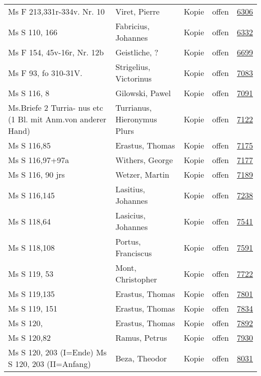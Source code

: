 \documentclass[10pt,a4paper,landscape]{report}
\begin{document}
\begin{longtable}{p{16cm}p{4cm}llr}
Ms F 213,331r-334v. Nr. 10	&	Viret, Pierre	&	Kopie	&	offen	&	\href{http://130.60.24.72/assignment/6306}{6306}\\
Ms S 110, 166	&	Fabricius, Johannes	&	Kopie	&	offen	&	\href{http://130.60.24.72/assignment/6332}{6332}\\
Ms F 154, 45v-16r, Nr. 12b	&	Geistliche, ?	&	Kopie	&	offen	&	\href{http://130.60.24.72/assignment/6699}{6699}\\
Ms F 93, fo 310-31V.	&	Strigelius, Victorinus	&	Kopie	&	offen	&	\href{http://130.60.24.72/assignment/7083}{7083}\\
Ms S 116, 8	&	Gilowski, Pawel	&	Kopie	&	offen	&	\href{http://130.60.24.72/assignment/7091}{7091}\\
Ms.Briefe 2 Turria- nus etc (1 Bl. mit Anm.von anderer Hand)	&	Turrianus, Hieronymus Plurs	&	Kopie	&	offen	&	\href{http://130.60.24.72/assignment/7122}{7122}\\
Ms S 116,85	&	Erastus, Thomas	&	Kopie	&	offen	&	\href{http://130.60.24.72/assignment/7175}{7175}\\
Ms S 116,97+97a	&	Withers, George	&	Kopie	&	offen	&	\href{http://130.60.24.72/assignment/7177}{7177}\\
Ms S 116, 90 jrs	&	Wetzer, Martin	&	Kopie	&	offen	&	\href{http://130.60.24.72/assignment/7189}{7189}\\
Ms S 116,145	&	Lasitius, Johannes	&	Kopie	&	offen	&	\href{http://130.60.24.72/assignment/7238}{7238}\\
Ms S 118,64	&	Lasicius, Johannes	&	Kopie	&	offen	&	\href{http://130.60.24.72/assignment/7541}{7541}\\
Ms S 118,108	&	Portus, Franciscus	&	Kopie	&	offen	&	\href{http://130.60.24.72/assignment/7591}{7591}\\
Ms S 119, 53	&	Mont, Christopher	&	Kopie	&	offen	&	\href{http://130.60.24.72/assignment/7722}{7722}\\
Ms S 119,135	&	Erastus, Thomas	&	Kopie	&	offen	&	\href{http://130.60.24.72/assignment/7801}{7801}\\
Ms S 119, 151	&	Erastus, Thomas	&	Kopie	&	offen	&	\href{http://130.60.24.72/assignment/7834}{7834}\\
Ms S 120,	&	Erastus, Thomas	&	Kopie	&	offen	&	\href{http://130.60.24.72/assignment/7892}{7892}\\
Ms S 120,82	&	Ramus, Petrus	&	Kopie	&	offen	&	\href{http://130.60.24.72/assignment/7930}{7930}\\
Ms S 120, 203 (I=Ende) Ms S 120, 203 (II=Anfang)	&	Beza, Theodor	&	Kopie	&	offen	&	\href{http://130.60.24.72/assignment/8031}{8031}\\

\end{longtable}
\end{document}
